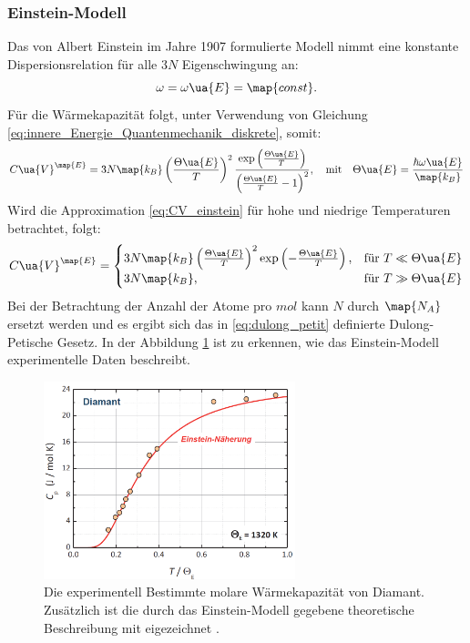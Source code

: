 \subsubsection{Einstein-Modell}
Das von Albert Einstein im Jahre 1907 formulierte Modell nimmt eine konstante
Dispersionsrelation für alle $3N$ Eigenschwingung an:
\begin{equation}
  \label{eq:dispersion_einstein}
  \omega=\omega\ua{E}=\map{const}.
\end{equation}
Für die Wärmekapazität folgt, unter Verwendung von Gleichung \eqref{eq:innere_Energie_Quantenmechanik_diskrete}, somit:
\begin{equation}
  \label{eq:CV_einstein}
  C\ua{V}^{\map{E}}= 3N\map{k_B}\left(\frac{\Theta\ua{E}}{T}\right)^2\frac{\exp\left(\frac{\Theta\ua{E}}{T}\right)}{\left(\frac{\Theta\ua{E}}{T}-1\right)^2}, \quad \text{mit} \quad \Theta\ua{E} = \frac{\hbar\omega\ua{E}}{\map{k_B}}
\end{equation}
Wird die Approximation \eqref{eq:CV_einstein} für hohe und niedrige Temperaturen
betrachtet, folgt:
\begin{equation}
  C\ua{V}^{\map{E}}=
  \begin{cases}
     3N\map{k_B}\left(\frac{\Theta\ua{E}}{T}\right)^2 \exp\left(-\frac{\Theta\ua{E}}{T}\right), &\text{für } T\ll\Theta\ua{E}  \\
     3N\map{k_B}, & \text{für } T \gg \Theta\ua{E}
  \end{cases}
\end{equation}
Bei der Betrachtung der Anzahl der Atome pro $\si{mol}$ kann $N$ durch $\map{N_A}$
ersetzt werden und es ergibt sich das in \eqref{eq:dulong_petit} definierte
Dulong-Petische Gesetz. In der Abbildung \ref{fig: einstein_modell_plot} ist zu erkennen, wie das Einstein-Modell
experimentelle Daten beschreibt.
\begin{figure}
  \centering
  \includegraphics[width = 0.65\textwidth]{./content/images/einstein.PNG}
  \caption{Die experimentell Bestimmte molare Wärmekapazität von Diamant. Zusätzlich ist die durch das Einstein-Modell
  gegebene theoretische Beschreibung mit eigezeichnet \cite[S. 225]{marx}.}
  \label{fig: einstein_modell_plot}
\end{figure}
